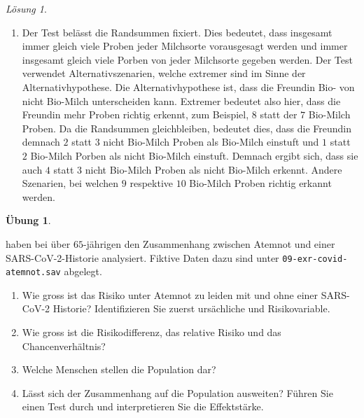 \documentclass[
]{book}
\providecommand{\tightlist}{%
  \setlength{\itemsep}{0pt}\setlength{\parskip}{0pt}}
\theoremstyle{definition}
\theoremstyle{definition}
\theoremstyle{definition}
\newtheorem{exercise}{Übung}[chapter]
\theoremstyle{definition}
\theoremstyle{remark}
\newtheorem*{solution}{Lösung}
\begin{document}
\begin{solution}
\begin{enumerate}
\def\labelenumi{\alph{enumi})}
\setcounter{enumi}{3}
\tightlist
\item
  Der Test belässt die Randsummen fixiert. Dies bedeutet, dass insgesamt immer gleich viele Proben jeder Milchsorte vorausgesagt werden und immer insgesamt gleich viele Porben von jeder Milchsorte gegeben werden. Der Test verwendet Alternativszenarien, welche extremer sind im Sinne der Alternativhypothese. Die Alternativhypothese ist, dass die Freundin Bio- von nicht Bio-Milch unterscheiden kann. Extremer bedeutet also hier, dass die Freundin mehr Proben richtig erkennt, zum Beispiel, \(8\) statt der \(7\) Bio-Milch Proben. Da die Randsummen gleichbleiben, bedeutet dies, dass die Freundin demnach \(2\) statt \(3\) nicht Bio-Milch Proben als Bio-Milch einstuft und \(1\) statt \(2\) Bio-Milch Porben als nicht Bio-Milch einstuft. Demnach ergibt sich, dass sie auch \(4\) statt \(3\) nicht Bio-Milch Proben als nicht Bio-Milch erkennt. Andere Szenarien, bei welchen \(9\) respektive \(10\) Bio-Milch Proben richtig erkannt werden.
\end{enumerate}

\end{solution}

\begin{exercise}
\protect\hypertarget{exr:covid-sterblichkeit}{}\label{exr:covid-sterblichkeit}\leavevmode

\citet{cohen2022} haben bei über \(65\)-jährigen den Zusammenhang zwischen Atemnot und einer SARS-CoV-2-Historie analysiert. Fiktive Daten dazu sind unter
\texttt{09-exr-covid-atemnot.sav} abgelegt.

\begin{enumerate}
\def\labelenumi{\alph{enumi})}
\tightlist
\item
  Wie gross ist das Risiko unter Atemnot zu leiden mit und ohne einer SARS-CoV-2 Historie? Identifizieren Sie zuerst ursächliche und Risikovariable.
\item
  Wie gross ist die Risikodifferenz, das relative Risiko und das Chancenverhältnis?
\item
  Welche Menschen stellen die Population dar?
\item
  Lässt sich der Zusammenhang auf die Population ausweiten? Führen Sie einen Test durch und interpretieren Sie die Effektstärke.
\end{enumerate}

\end{exercise}
\end{document}
